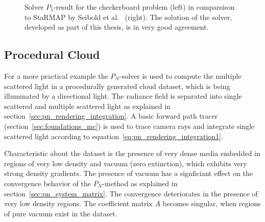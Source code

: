 \begin{figure}[h]
\begin{subfigure}{0.49\columnwidth}
\end{subfigure}%
\caption{Solver $P_5$-result for the checkerboard problem (left) in comparsison to \textsf{StaRMAP} by Seibold et al.~\cite{Seibold14} (right). The solution of the solver, developed as part of this thesis, is in very good agreement.}
\label{fig:pn_results_checkerboard1}
\end{figure}

\subsection{Procedural Cloud}
\label{sec:pn_results_clouds}

For a more practical example the $P_N$-solver is used to compute the multiple scattered light in a procedurally generated cloud dataset, which is being illuminated by a directional light. The radiance field is separated into single scattered and multiple scattered light as explained in section~\ref{sec:pn_rendering_integration}. A basic forward path tracer (section~\ref{sec:foundations_mc}) is used to trace camera rays and integrate single scattered light according to equation~\ref{eq:pn_rendering_integration1}.

Characteristic about the dataset is the presence of very dense media embedded in regions of very low density and vacuum (zero extinction), which exhibits very strong density gradients. The presence of vacuum has a signficiant effect on the convergence behavior of the $P_N$-method as explained in section~\ref{sec:pn_system_matrix}. The convergence deteriorates in the presence of very low density regions. The coefficient matrix $A$ becomes singular, when regions of pure vacuum exist in the dataset.

